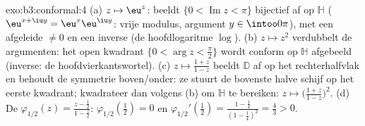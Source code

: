 \begin{solution}{exo:b3:conformal:4}
(a) $z \mapsto \eu^z$: beeldt $\{0 < \operatorname{Im}z < \pi\}$
bijectief af op $\mathbb H$ ($\eu^{x+\iu y} = \eu^x\eu^{\iu y}$:
vrije modulus, argument $y \in \intoo0\pi$),  met een
afgeleide $\neq 0$ en een  inverse (de hoofdlogaritme
$\log$).
(b) $z \mapsto z^2$ verdubbelt de argumenten: het open kwadrant
$\{0 < \arg z < \frac\pi2\}$ wordt conform op $\mathbb H$
afgebeeld (inverse: de hoofdvierkantswortel).
(c) $z \mapsto \frac{1 + z}{1 - z}$ beeldt $\mathbb D$ af op het
rechterhalfvlak en behoudt de symmetrie boven/onder: ze stuurt de
bovenste halve schijf op het eerste kwadrant; kwadrateer dan
volgens (b) om $\mathbb H$ te bereiken: $z \mapsto \bigl(\frac{1
+ z}{1 - z}\bigr)^2$.
(d) De  $\varphi_{1/2}(z) = \frac{z - \frac12}{1 -
\frac z2}$: $\varphi_{1/2}(\tfrac12) = 0$ en
$\varphi_{1/2}'(\tfrac12) = \frac{1 - \frac14}{(1 - \frac14)^2} =
\frac43 > 0$.
\end{solution}

